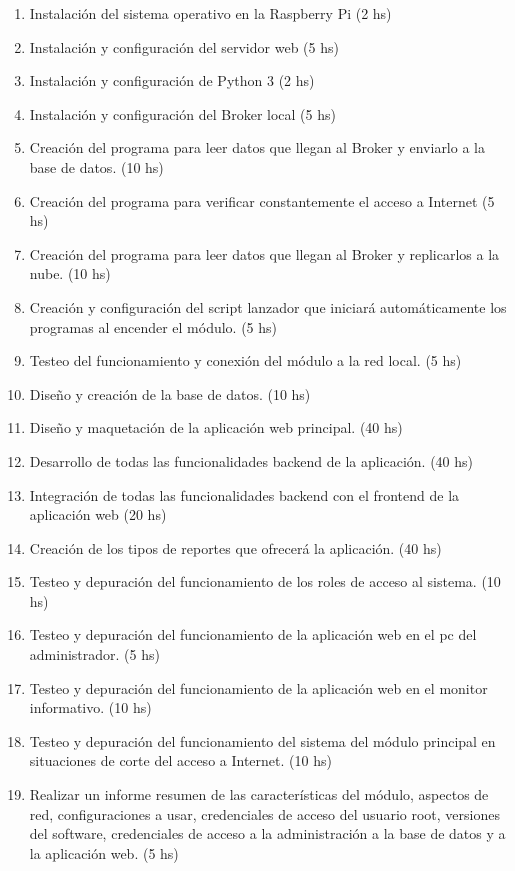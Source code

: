 \documentclass[11pt]{charter}
\begin{document}
\begin{enumerate}
\begin{enumerate}
	\item Instalación del sistema operativo en la Raspberry Pi (2 hs)
	\item Instalación y configuración del servidor web (5 hs)
	\item Instalación y configuración de Python 3 (2 hs)
	\item Instalación y configuración del Broker local (5 hs)
	\item Creación del programa para leer datos que llegan al Broker y enviarlo a la base de datos. (10 hs)
	\item Creación del programa para verificar constantemente el acceso a Internet (5 hs)
	\item Creación del programa para leer datos que llegan al Broker y replicarlos a la nube. (10 hs)
	\item Creación y configuración del script lanzador que iniciará automáticamente los programas al encender el módulo. (5 hs)
	\item Testeo del funcionamiento y conexión del módulo a la red local. (5 hs)
	\item Diseño y creación de la base de datos. (10 hs)
	\item Diseño y maquetación de la aplicación web principal. (40 hs)
	\item Desarrollo de todas las funcionalidades backend de la aplicación. (40 hs)
	\item Integración de todas las funcionalidades backend con el frontend de la aplicación web (20 hs)
	\item Creación de los tipos de reportes que ofrecerá la aplicación. (40 hs)
	\item Testeo y depuración del funcionamiento de los roles de acceso al sistema. (10 hs)
	\item Testeo y depuración del funcionamiento de la aplicación web en el pc del administrador. (5 hs)
	\item Testeo y depuración del funcionamiento de la aplicación web en el monitor informativo. (10 hs)
	\item Testeo y depuración del funcionamiento del sistema del módulo principal en situaciones de corte del acceso a Internet. (10 hs) 
	\item Realizar un informe resumen de las características del módulo, aspectos de red, configuraciones a usar, credenciales de acceso del usuario root, versiones del software, credenciales de acceso a la administración a la base de datos y a la aplicación web. (5 hs)
	\end{enumerate}


\end{enumerate}
\end{document}
